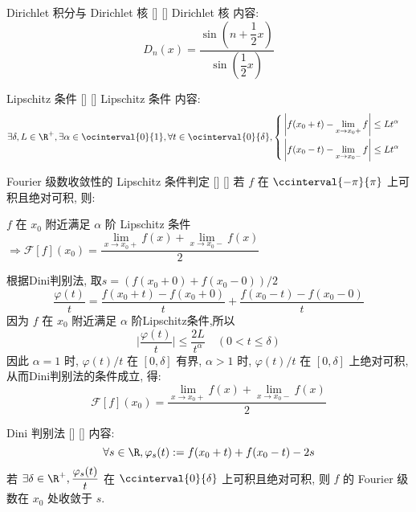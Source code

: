 \documentclass[UTF8]{ctexart}
\begin{document}
			\begin{dfn}
			    []
			    {Dirichlet 积分与 Dirichlet 核}
			    []
			    []
			{}
			{Dirichlet 核}
			{}
			{}
				内容: 
				\[D_n(x)=\frac{\sin(n+\dfrac{1}{2}x)}{\sin(\dfrac{1}{2}x)}\]
			\end{dfn}

			\begin{prf}
				
			\end{prf}

			\begin{dfn}
			    []
			    {Lipschitz 条件}
			    []
			    []
			{}
			{Lipschitz 条件}
			{}
			{}
				内容: 
				\[\exists\delta,L\in\R^+, \exists\alpha\in\ocinterval{0}{1}, \forall t\in\ocinterval{0}{\delta}, 
				\begin{cases}
					\begin{aligned}
						&\left|f(x_0+t)-\lim_{x\to x_0+}f\right|\leq Lt^{\alpha}\\
						&\left|f(x_0-t)-\lim_{x\to x_0-}f\right|\leq Lt^{\alpha}
					\end{aligned}
				\end{cases}\]
			\end{dfn}

			\begin{thm}
			    []
			    {Fourier 级数收敛性的 Lipschitz 条件判定}
			    []
			    []
				若 \(f\) 在 \(\ccinterval{-\pi}{\pi}\) 上可积且绝对可积, 则: 

				\(f\) 在 \(x_0\) 附近满足 \(\alpha\) 阶 Lipschitz 条件 \(\Longrightarrow\mathcal{F}[f](x_0)=\dfrac{\lim\limits_{x\to x_0+}f(x)+\lim\limits_{x\to x_0-}f(x)}{2}\) 
			\end{thm}

			\begin{prf}
				根据Dini判别法, 取\(s=(f(x_0+0)+f(x_0-0))/2\)
				\[\frac{\varphi(t)}{t}=\frac{f(x_0+t)-f(x_0+0)}{t}+\frac{f(x_0-t)-f(x_0-0)}{t}\]
				因为 \(f\) 在 \(x_0\) 附近满足 \(\alpha\) 阶Lipschitz条件,所以
				\[\bigg\vert\frac{\varphi(t)}{t}\bigg\vert\leqslant \frac{2L}{t^\alpha}\quad(0<t\leqslant\delta)\]
				因此 \(\alpha=1\) 时,  \(\varphi(t)/t\) 在 \([0,\delta]\) 有界,  \(\alpha>1\) 时,  \(\varphi(t)/t\) 在 \([0,\delta]\) 上绝对可积,从而Dini判别法的条件成立, 得: 
				\[\mathcal{F}[f](x_0)=\frac{\lim\limits_{x\to x_0+}f(x)+\lim\limits_{x\to x_0-}f(x)}{2}\]
			\end{prf}

			\begin{crl}
			    []
			    {Dini 判别法}
			    []
			    []
				内容: 
				\[\forall s\in\R, \varphi_s(t):=f(x_0+t)+f(x_0-t)-2s\]
				若 \(\exists\delta\in\R^+, \dfrac{\varphi_s(t)}{t}\) 在 \(\ccinterval{0}{\delta}\) 上可积且绝对可积, 则 \(f\) 的 Fourier 级数在 \(x_0\) 处收敛于 \(s\). 
			\end{crl}
\end{document}
